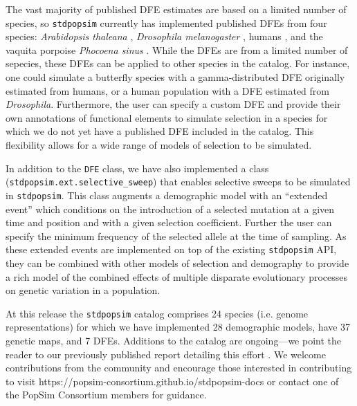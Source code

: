\documentclass[hidelinks]{article}
\newcommand{\stdpopsim}{\texttt{stdpopsim}\xspace}
\begin{document}
    The vast majority of published DFE estimates are based on a limited number of species,
    so \stdpopsim currently has implemented published DFEs from
    four species: \textit{Arabidopsis thaleana} \citep{huber2018gene}, \textit{Drosophila melanogaster} \citep{ragsdale2016triallelic,huber2017determining},
    humans \citep{huber2017determining,kim2017inference}, and the vaquita porpoise \textit{Phocoena sinus} \citep{robinson2022critically}.
    While the DFEs are from a limited number of sepecies, these DFEs can be applied to other species
    in the catalog. For instance, one could simulate a butterfly species with a gamma-distributed DFE originally
    estimated from humans, or a human population with a DFE estimated from \textit{Drosophila}.
    Furthermore, the user can specify a custom DFE and provide their own annotations
    of functional elements to simulate selection in a species for which we do not yet have 
    a published DFE included in the catalog. This flexibility allows for a wide range of
    models of selection to be simulated. %
   
    In addition to the \texttt{DFE} class, we have also implemented a class (\texttt{stdpopsim.ext.selective\_sweep})
    that enables selective sweeps to be simulated in \stdpopsim.
    This class augments a demographic model with an ``extended event''
    which conditions on the introduction of a selected mutation at a given time and position
    and with a given selection coefficient. Further the user can specify the minimum frequency
    of the selected allele at the time of sampling. As these extended events are implemented
    on top of the existing \stdpopsim API, they can be combined with other models of selection
    and demography to provide a rich model of the combined effects of multiple disparate evolutionary processes
    on genetic variation in a population.
    

    At this release the \stdpopsim catalog comprises 24 species (i.e. genome representations)
    for which we have implemented 28 demographic models, have 37 genetic maps, and 7 DFEs. %
    Additions to the catalog are ongoing---we point the reader to our previously published 
    report detailing this effort \citep{lauterbur2023expanding}. We welcome contributions from the
    community and encourage those interested in contributing to visit https://popsim-consortium.github.io/stdpopsim-docs
    or contact one of the PopSim Consortium members for guidance.
\end{document}
